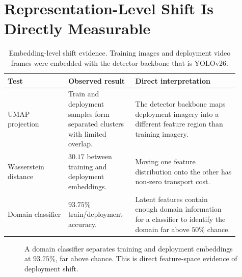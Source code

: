 \documentclass[10pt]{article}
\begin{document}
\section{Representation-Level Shift Is Directly Measurable}

\begin{table}[H]
\centering
\caption{Embedding-level shift evidence. Training images and deployment video frames were embedded with the detector backbone that is YOLOv26.}
\small
\begin{tabular}{>{\raggedright\arraybackslash}p{0.24\linewidth}>{\raggedright\arraybackslash}p{0.25\linewidth}>{\raggedright\arraybackslash}p{0.41\linewidth}}
\toprule
Test & Observed result & Direct interpretation\\
\midrule
UMAP projection & Train and deployment samples form separated clusters with limited overlap. & The detector backbone maps deployment imagery into a different feature region than training imagery.\\
Wasserstein distance & \(30.17\) between training and deployment embeddings. & Moving one feature distribution onto the other has non-zero transport cost.\\
Domain classifier & \(93.75\%\) train/deployment accuracy. & Latent features contain enough domain information for a classifier to identify the domain far above \(50\%\) chance.\\
\bottomrule
\end{tabular}
\end{table}

\begin{figure}[H]
\centering
{}
\caption{A domain classifier separates training and deployment embeddings at \(93.75\%\), far above chance. This is direct feature-space evidence of deployment shift.}
\end{figure}
\end{document}
